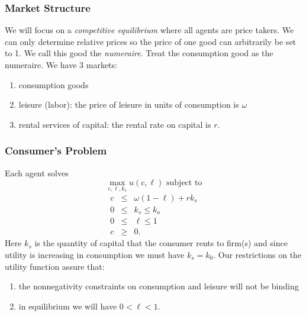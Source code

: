 \documentclass[aspectratio=169]{ltx-talk}
\begin{document}
\begin{frame}
\frametitle{Market Structure}
We will focus on a \textit{competitive equilibrium} where all agents are
price takers. We can only determine relative prices so the price of one good
can arbitrarily be set to 1. We call this good the \textit{numeraire}. Treat
the consumption good as the numeraire. We have 3 markets:

\begin{enumerate}
\item consumption goods

\item leisure (labor): the price of leisure in units of consumption is $%
\omega $

\item rental services of capital: the rental rate on capital is $r.$
\end{enumerate}
\end{frame}

\begin{frame}
\frametitle{Consumer{'}s Problem}
Each agent solves%
\begin{equation*}
\underset{c,\ell ,k_{s}}{\max }u(c,\ell )\text{ subject to}
\end{equation*}%
\begin{eqnarray*}
c &\leq &\omega \left( 1-\ell \right) +rk_{s} \\
0 &\leq &k_{s}\leq k_{o} \\
0 &\leq &\ell \leq 1 \\
c &\geq &0.
\end{eqnarray*}%
Here $k_{s}$ is the quantity of capital that the consumer rents to firm(s)
and since utility is increasing in consumption we must have $k_{s}=k_{0}$.
Our restrictions on the utility function assure that:

\begin{enumerate}
\item the nonnegativity constraints on consumption and leisure will not be
binding

\item in equilibrium we will have $0<\ell <1.$
\end{enumerate}
\end{frame}
\end{document}
